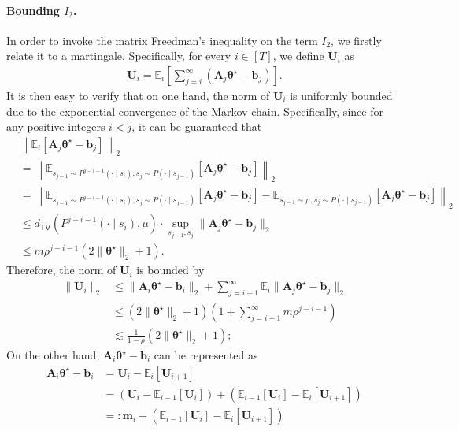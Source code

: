 \paragraph{Bounding $I_2$.} In order to invoke the matrix Freedman's inequality on the term $I_2$, we firstly relate it to a martingale. Specifically, for every $i \in [T]$, we define $\bm{U}_i$ as
\begin{align}\label{eq:defn-Ui}
\bm{U}_i = \mathbb{E}_i \left[\sum_{j=i}^{\infty} (\bm{A}_j \bm{\theta}^\star - \bm{b}_j)\right].
\end{align}
It is then easy to verify that on one hand, the norm of $\bm{U}_i$ is uniformly bounded due to the exponential convergence of the Markov chain. Specifically, since for any positive integers $i<j$, it can be guaranteed that
\begin{align*}
&\left\|\mathbb{E}_i[\bm{A}_j \bm{\theta}^\star - \bm{b}_j]\right\|_2 \\ 
&=\left\|\mathbb{E}_{s_{j-1} \sim P^{j-i-1}(\cdot \mid s_i),s_j \sim P(\cdot \mid s_{j-1})}[\bm{A}_j \bm{\theta}^\star - \bm{b}_j]\right\|_2 \\ 
&= \left\|\mathbb{E}_{s_{j-1} \sim P^{j-i-1}(\cdot \mid s_i),s_j \sim P(\cdot \mid s_{j-1})}[\bm{A}_j \bm{\theta}^\star - \bm{b}_j]-\mathbb{E}_{s_{j-1} \sim \mu,s_j \sim P(\cdot \mid s_{j-1})}[\bm{A}_j \bm{\theta}^\star - \bm{b}_j]\right\|_2 \\ 
&\leq d_{\mathsf{TV}}(P^{j-i-1}(\cdot\mid s_i),\mu) \cdot \sup_{s_{j-1},s_j}\|\bm{A}_j \bm{\theta}^\star - \bm{b}_j\|_2 \\ 
&\leq m\rho^{j-i-1} (2\|\bm{\theta}^\star\|_2+1).
\end{align*}
Therefore, the norm of $\bm{U}_i$ is bounded by
\begin{align}\label{eq:U-bound}
\|\bm{U}_i\|_2 &\leq \|\bm{A}_i \bm{\theta}^\star - \bm{b}_i\|_2 + \sum_{j=i+1}^{\infty}\mathbb{E}_i \|\bm{A}_j \bm{\theta}^\star - \bm{b}_j\|_2 \nonumber \\ 
&\leq (2\|\bm{\theta}^\star\|_2+1) \left(1+\sum_{j=i+1}^{\infty} m\rho^{j-i-1}\right)\nonumber \\ 
& \lesssim \frac{1}{1-\rho} (2\|\bm{\theta}^\star\|_2+1);
\end{align}
On the other hand, $\bm{A}_i \bm{\theta}^\star - \bm{b}_i$ can be represented as
\begin{align}\label{eq:Ui-telescope}
\bm{A}_i \bm{\theta}^\star - \bm{b}_i &= \bm{U}_i - \mathbb{E}_i[\bm{U}_{i+1}]\nonumber \\
&= (\bm{U}_i - \mathbb{E}_{i-1}[\bm{U}_i]) + (\mathbb{E}_{i-1}[\bm{U}_i] - \mathbb{E}_i[\bm{U}_{i+1}])\nonumber \\ 
&=: \bm{m}_i + (\mathbb{E}_{i-1}[\bm{U}_i] - \mathbb{E}_i[\bm{U}_{i+1}])
\end{align}
